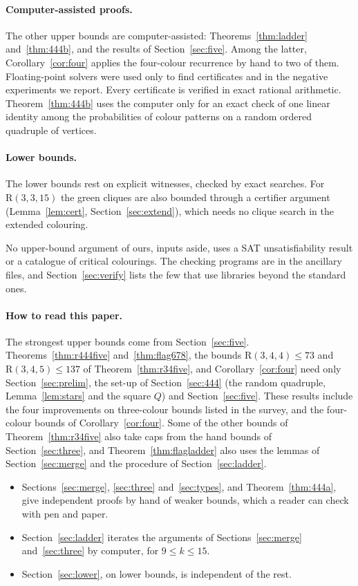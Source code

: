 \documentclass[11pt]{article}
\theoremstyle{spacedplain}
\theoremstyle{spaceddef}
\theoremstyle{spacedremark}
\newcommand{\R}{\mathrm{R}}
\begin{document}
\paragraph{Computer-assisted proofs.}
The other upper bounds are computer-assisted: Theorems~\ref{thm:ladder} and~\ref{thm:444b}, and the results of Section~\ref{sec:five}.
Among the latter, Corollary~\ref{cor:four} applies the four-colour recurrence by hand to two of them.
Floating-point solvers were used only to find certificates and in the negative experiments we report.
Every certificate is verified in exact rational arithmetic.
Theorem~\ref{thm:444b} uses the computer only for an exact check of one linear identity among the probabilities of colour patterns on a random ordered quadruple of vertices.

\paragraph{Lower bounds.}
The lower bounds rest on explicit witnesses, checked by exact searches.
For $\R(3,3,15)$ the green cliques are also bounded through a certifier argument (Lemma~\ref{lem:cert}, Section~\ref{sec:extend}), which needs no clique search in the extended colouring.

No upper-bound argument of ours, inputs aside, uses a SAT unsatisfiability result or a catalogue of critical colourings.
The checking programs are in the ancillary files, and Section~\ref{sec:verify} lists the few that use libraries beyond the standard ones.

\paragraph{How to read this paper.}
The strongest upper bounds come from Section~\ref{sec:five}.
Theorems~\ref{thm:r444five} and~\ref{thm:flag678}, the bounds $\R(3,4,4)\le 73$ and $\R(3,4,5)\le 137$ of Theorem~\ref{thm:r34five}, and Corollary~\ref{cor:four} need only Section~\ref{sec:prelim}, the set-up of Section~\ref{sec:444} (the random quadruple, Lemma~\ref{lem:stars} and the square $Q$) and Section~\ref{sec:five}.
These results include the four improvements on three-colour bounds listed in the survey, and the four-colour bounds of Corollary~\ref{cor:four}.
Some of the other bounds of Theorem~\ref{thm:r34five} also take caps from the hand bounds of Section~\ref{sec:three}, and Theorem~\ref{thm:flagladder} also uses the lemmas of Section~\ref{sec:merge} and the procedure of Section~\ref{sec:ladder}.
\begin{itemize}
\item Sections~\ref{sec:merge}, \ref{sec:three} and~\ref{sec:types}, and Theorem~\ref{thm:444a}, give independent proofs by hand of weaker bounds, which a reader can check with pen and paper.
\item Section~\ref{sec:ladder} iterates the arguments of Sections~\ref{sec:merge} and~\ref{sec:three} by computer, for $9\le k\le 15$.
\item Section~\ref{sec:lower}, on lower bounds, is independent of the rest.
\end{itemize}
\end{document}
